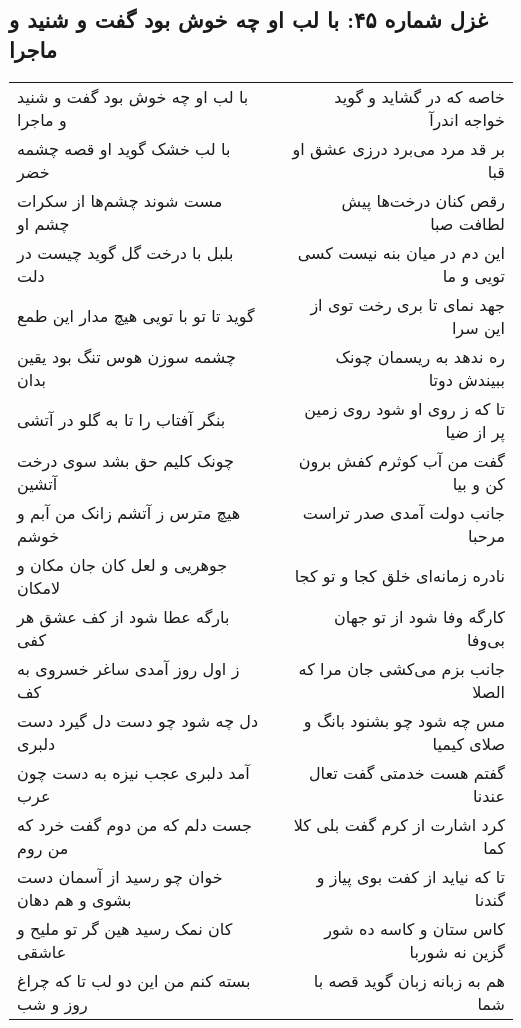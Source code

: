 \begin{center}
\section*{غزل شماره ۴۵: با لب او چه خوش بود گفت و شنید و ماجرا}
\label{sec:0045}
\begin{longtable}{l p{0.5cm} r}
با لب او چه خوش بود گفت و شنید و ماجرا
&&
خاصه که در گشاید و گوید خواجه اندرآ
\\
با لب خشک گوید او قصه چشمه خضر
&&
بر قد مرد می‌برد درزی عشق او قبا
\\
مست شوند چشم‌ها از سکرات چشم او
&&
رقص کنان درخت‌ها پیش لطافت صبا
\\
بلبل با درخت گل گوید چیست در دلت
&&
این دم در میان بنه نیست کسی تویی و ما
\\
گوید تا تو با تویی هیچ مدار این طمع
&&
جهد نمای تا بری رخت توی از این سرا
\\
چشمه سوزن هوس تنگ بود یقین بدان
&&
ره ندهد به ریسمان چونک ببیندش دوتا
\\
بنگر آفتاب را تا به گلو در آتشی
&&
تا که ز روی او شود روی زمین پر از ضیا
\\
چونک کلیم حق بشد سوی درخت آتشین
&&
گفت من آب کوثرم کفش برون کن و بیا
\\
هیچ مترس ز آتشم زانک من آبم و خوشم
&&
جانب دولت آمدی صدر تراست مرحبا
\\
جوهریی و لعل کان جان مکان و لامکان
&&
نادره زمانه‌ای خلق کجا و تو کجا
\\
بارگه عطا شود از کف عشق هر کفی
&&
کارگه وفا شود از تو جهان بی‌وفا
\\
ز اول روز آمدی ساغر خسروی به کف
&&
جانب بزم می‌کشی جان مرا که الصلا
\\
دل چه شود چو دست دل گیرد دست دلبری
&&
مس چه شود چو بشنود بانگ و صلای کیمیا
\\
آمد دلبری عجب نیزه به دست چون عرب
&&
گفتم هست خدمتی گفت تعال عندنا
\\
جست دلم که من دوم گفت خرد که من روم
&&
کرد اشارت از کرم گفت بلی کلا کما
\\
خوان چو رسید از آسمان دست بشوی و هم دهان
&&
تا که نیاید از کفت بوی پیاز و گندنا
\\
کان نمک رسید هین گر تو ملیح و عاشقی
&&
کاس ستان و کاسه ده شور گزین نه شوربا
\\
بسته کنم من این دو لب تا که چراغ روز و شب
&&
هم به زبانه زبان گوید قصه با شما
\\
\end{longtable}
\end{center}
